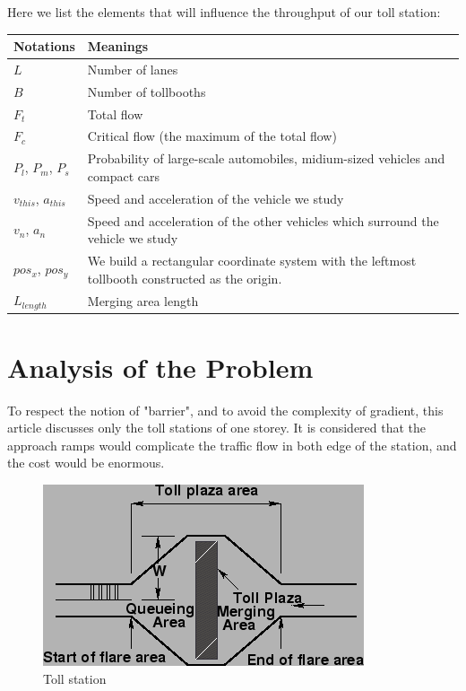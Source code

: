 \documentclass{mcmthesis}
\begin{document}
Here we list the elements that will influence the throughput of our toll station:

\begin{tabular}{|m{7cm}<{\centering}|p{7cm}<{\centering}|}
	\hline
	Notations & Meanings \\
	\hline
	 $L$ &  Number of lanes \\
	\hline
	 $B$ &  Number of tollbooths\\
	 \hline
     $F_t$ & 	 Total flow\\
     \hline
     $F_c$ & Critical flow (the maximum of the total flow)\\
     \hline
     $P_l$,  $P_m$, $P_s$ & Probability of large-scale automobiles, midium-sized vehicles and compact cars\\
     \hline
     $v_{this}$, $a_{this}$ & Speed and acceleration of the vehicle we study\\
     \hline
      $v_n$, $a_n$ &  Speed and acceleration of the other vehicles which surround the vehicle we study\\
     \hline
     $pos_x$, $pos_y$ & We build a rectangular coordinate system  with the leftmost tollbooth constructed as the origin.\\
     \hline
     $L_{length}$ & Merging area length \\
     \hline

\end{tabular}


\section{Analysis of the Problem}
To respect the notion of "barrier", and to avoid the complexity of gradient, this article discusses only the toll stations of one storey. It is considered that the approach ramps would complicate the traffic flow in both edge of the station, and the cost would be enormous.

\begin{figure}[htbp]
\small
\centering
\caption{Toll station \cite{note}} \label{fig:Ts}
\includegraphics{img3.png}
\end{figure}
\end{document}
